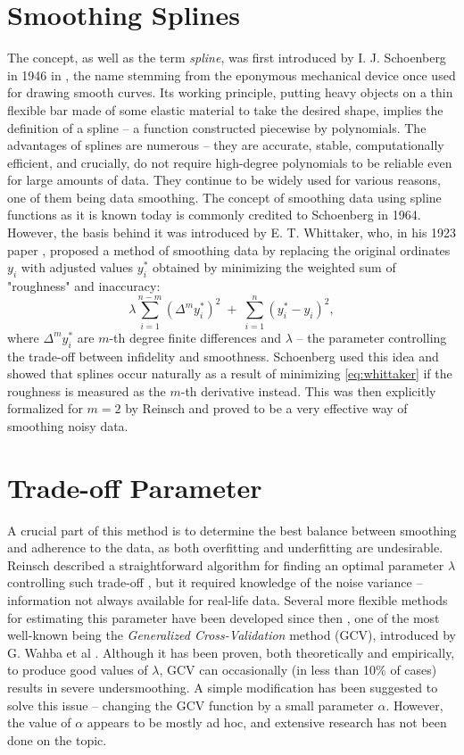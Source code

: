 \documentclass[11pt,leqno]{book}
\theoremstyle{definition}
\theoremstyle{plain}
\theoremstyle{definition}
\begin{document}
{\section{Smoothing Splines}
The concept, as well as the term \textit{spline}, was first introduced by I. J. Schoenberg in 1946 in \cite{Schoenberg1946}, the name stemming from the eponymous mechanical device once used for drawing smooth curves. Its working principle, putting heavy objects on a thin flexible bar made of some elastic material to take the desired shape, implies the definition of a spline -- a function constructed piecewise by polynomials. The advantages of splines are numerous -- they are accurate, stable, computationally efficient, and crucially, do not require high-degree polynomials to be reliable even for large amounts of data. They continue to be widely used for various reasons, one of them being data smoothing.
The concept of smoothing data using spline functions as it is known today is commonly credited to Schoenberg \cite{schoen1964} in 1964. However, the basis behind it was introduced by E. T. Whittaker, who, in his 1923 paper \cite{Whittaker_1922}, proposed a method of smoothing data by replacing the original ordinates $y_i$ with adjusted values $y^{*}_i$ obtained by minimizing the weighted sum of "roughness" and inaccuracy:
\begin{equation}
\lambda \sum_{i=1}^{n-m} \left( \Delta^m y_i^{*} \right)^2
\;+\;
\sum_{i=1}^{n} \left( y_i^{*} - y_i \right)^2,
\label{eq:whittaker}
\end{equation}
where $ \Delta^m y_i^{*}$ are $m$-th degree finite differences and $\lambda$ -- the parameter controlling the trade-off between infidelity and smoothness. Schoenberg used this idea and showed that splines occur naturally as a result of minimizing \eqref{eq:whittaker} if the roughness is measured as the $m$-th derivative instead. This was then explicitly formalized for $m=2$ by Reinsch \cite{REINSCH1967} and proved to be a very effective way of smoothing noisy data. 
\section{Trade-off Parameter}
A crucial part of this method is to determine the best balance between smoothing and adherence to the data, as both overfitting and underfitting are undesirable. Reinsch described a straightforward algorithm for finding an optimal parameter $\lambda$ controlling such trade-off \cite{REINSCH1967}, but it required knowledge of the noise variance -- information not always available for real-life data. Several more flexible methods for estimating this parameter have been developed since then \cite{LEE2003139}, one of the most well-known being the \textit{Generalized Cross-Validation} method (GCV), introduced by G. Wahba et al \cite{Golub01051979}. Although it has been proven, both theoretically and empirically, to produce good values of $\lambda$, GCV can occasionally (in less than 10$\%$ of cases) results in severe undersmoothing. A simple modification has been suggested \cite{kim-gu} to solve this issue -- changing the GCV function by a small parameter $\alpha$. However, the value of $\alpha$ appears to be mostly ad hoc, and extensive research has not been done on the topic.
}
\end{document}
